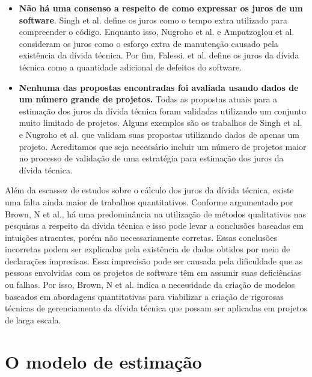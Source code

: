 \begin{itemize}
\item \textbf{Não há uma consenso a respeito de como expressar os juros de um software}. Singh et al.\cite{singh2014framework} define os juros como o tempo extra utilizado para compreender o código. Enquanto isso, Nugroho et al.\cite{nugroho2011empirical} e Ampatzoglou et al. \cite{ampatzoglou2015financial,ampatzoglou2018framework} consideram os juros como o esforço extra de manutenção causado pela existência da dívida técnica. Por fim, Falessi. et al. \cite{falessi2015towards} define os juros da dívida técnica como a quantidade adicional de defeitos do software.
\item \textbf{Nenhuma das propostas encontradas foi avaliada usando dados de um número grande de projetos.} Todas as propostas atuais para a estimação dos juros da dívida técnica foram validadas utilizando um conjunto muito limitado de projetos. Alguns exemplos são os trabalhos de Singh et al.\cite{singh2014framework} e Nugroho et al. \cite{nugroho2011empirical} que validam suas propostas utilizando dados de apenas um projeto. Acreditamos que seja necessário incluir um número de projetos maior no processo de validação de uma estratégia para estimação dos juros da dívida técnica. 

\end{itemize}

Além da escassez de estudos sobre o cálculo dos juros da dívida técnica, existe uma falta ainda maior de trabalhos quantitativos. Conforme argumentado por Brown, N et al.\cite{brown2010managing}, há uma predominância na utilização de métodos qualitativos nas pesquisas a respeito da dívida técnica e isso pode levar a conclusões baseadas em intuições atraentes, porém não necessariamente corretas. Essas conclusões incorretas podem ser explicadas pela existência de dados obtidos por meio de declarações imprecisas. Essa imprecisão pode ser causada pela dificuldade que as pessoas envolvidas com os projetos de software têm em assumir suas deficiências ou falhas. Por isso, Brown, N et al.\cite{brown2010managing} indica a necessidade da criação de modelos baseados em abordagens quantitativas para viabilizar a criação de rigorosas técnicas de gerenciamento da dívida técnica que possam ser aplicadas em projetos de larga escala. 


\section{O modelo de estimação}


